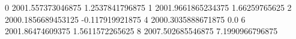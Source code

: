0 2001.557373046875 1.2537841796875
1 2001.9661865234375 1.66259765625
2 2000.1856689453125 -0.117919921875
4 2000.3035888671875 0.0
6 2001.86474609375 1.5611572265625
8 2007.502685546875 7.1990966796875
